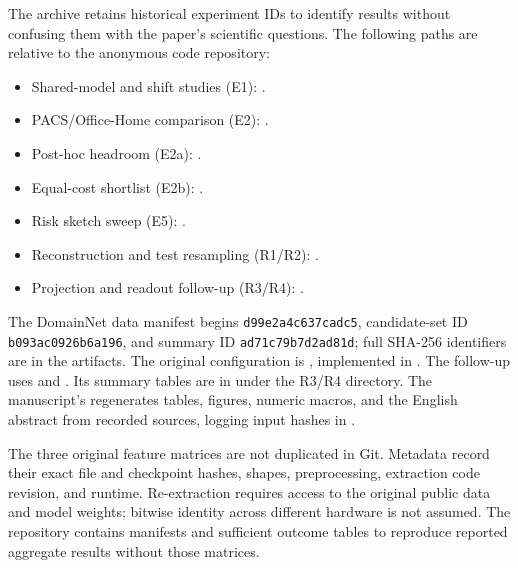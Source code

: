 The archive retains historical experiment IDs to identify results without confusing them with the paper's scientific questions. The following paths are relative to the anonymous code repository:
\begin{itemize}
\item Shared-model and shift studies (E1): .
\item PACS/Office-Home comparison (E2): .
\item Post-hoc headroom (E2a): .
\item Equal-cost shortlist (E2b): .
\item Risk sketch sweep (E5): .
\item Reconstruction and test resampling (R1/R2): .
\item Projection and readout follow-up (R3/R4): .
\end{itemize}
{\raggedright
The DomainNet data manifest begins \texttt{d99e2a4c637cadc5}, candidate-set ID \texttt{b093ac0926b6a196}, and summary ID \texttt{ad71c79b7d2ad81d}; full SHA-256 identifiers are in the artifacts. The original configuration is , implemented in . The follow-up uses  and . Its summary tables are in  under the R3/R4 directory. The manuscript's  regenerates tables, figures, numeric macros, and the English abstract from recorded sources, logging input hashes in .\par}

The three original feature matrices are not duplicated in Git. Metadata record their exact file and checkpoint hashes, shapes, preprocessing, extraction code revision, and runtime. Re-extraction requires access to the original public data and model weights; bitwise identity across different hardware is not assumed. The repository contains manifests and sufficient outcome tables to reproduce reported aggregate results without those matrices.

